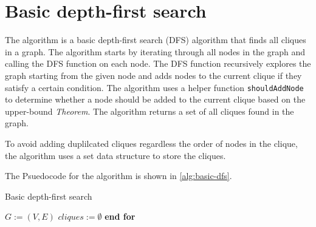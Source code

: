 \section{Basic depth-first search}
The algorithm is a basic depth-first search (DFS) algorithm that finds all cliques in a graph. The algorithm starts by iterating through all nodes in the graph and calling the DFS function on each node. The DFS function recursively explores the graph starting from the given node and adds nodes to the current clique if they satisfy a certain condition. The algorithm uses a helper function \texttt{shouldAddNode} to determine whether a node should be added to the current clique based on the upper-bound \emph{Theorem}. The algorithm returns a set of all cliques found in the graph.

To avoid adding duplilcated cliques regardless the order of nodes in the clique, the algorithm uses a set data structure to store the cliques.

The Psuedocode for the algorithm is shown in \autoref{alg:basic-dfs}.


\begin{algorithm}
    \caption{Basic depth-first search}
    \label{alg:basic-dfs}



    $G := (V,E)$ 
    $cliques := \emptyset$ 
    \textbf{end for}

\end{algorithm}